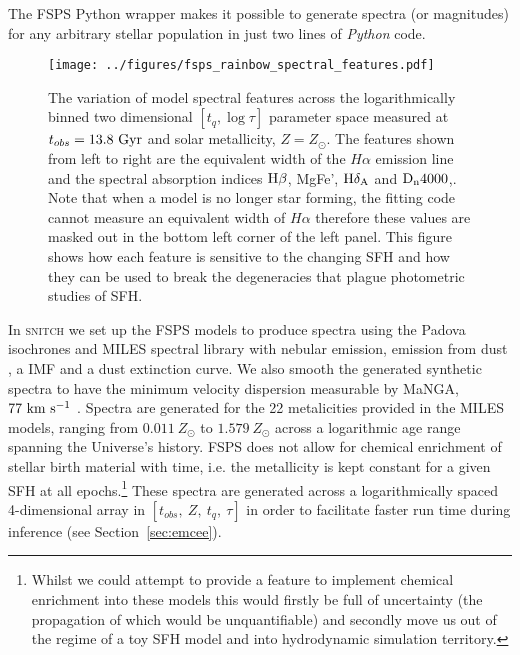 \documentclass[useAMS,usenatbib]{mn2e}
\begin{document}
The FSPS Python wrapper makes it possible to generate spectra (or magnitudes) for any arbitrary stellar population in just two lines of \emph{Python} code. 


\begin{figure*}
\centering
\texttt{[image: ../figures/fsps\_rainbow\_spectral\_features.pdf]}
\caption{The variation of model spectral features across the logarithmically binned two dimensional $[t_q, \log \tau]$ parameter space measured at $t_{obs}=13.8~\rm{Gyr}$ and solar metallicity, $Z=Z_{\odot}$. The features shown from left to right are the equivalent width of the $H\alpha$ emission line and the spectral absorption indices $\rm{H}\beta$, MgFe', $\rm{H}\delta_A$ and $\rm{D}_n4000$,. Note that when a model is no longer star forming, the fitting code cannot measure an equivalent width of $H\alpha$ therefore these values are masked out in the bottom left corner of the left panel. This figure shows how each feature is sensitive to the changing SFH and how they can be used to break the degeneracies that plague photometric studies of SFH. }
\label{fig:rainbow}
\end{figure*}



In \textsc{snitch} we set up the FSPS models to produce spectra using the Padova isochrones \citep{girardi02} and MILES spectral library \citep{vazdekis16} with nebular emission, emission from dust \cite{draineli07}, a \cite{chabrier03} IMF and a \cite{calzetti00} dust extinction curve. We also smooth the generated synthetic spectra to have the minimum velocity dispersion measurable by MaNGA, $77~\rm{km}~{s}^{-1}$ \citep{bundy15}. Spectra are generated for the 22 metalicities provided in the MILES models, ranging from $0.011~Z_{\odot}$ to $1.579~Z_{\odot}$ across a logarithmic age range spanning the Universe's history. FSPS does not allow for chemical enrichment of stellar birth material with time, i.e. the metallicity is kept constant for a given SFH at all epochs.\footnote{Whilst we could attempt to provide a feature to implement chemical enrichment into these models this would firstly be full of uncertainty (the propagation of which would be unquantifiable) and secondly move us out of the regime of a toy SFH model and into hydrodynamic simulation territory. } These spectra are generated across a logarithmically spaced 4-dimensional array in $[t_{obs},~Z,~t_q,~\tau]$ in order to facilitate faster run time during inference (see Section~\ref{sec:emcee}).
\end{document}
